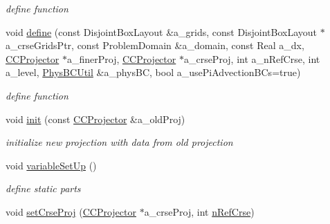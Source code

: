 \begin{DoxyCompactItemize}
\begin{DoxyCompactList}\small\item\em define function \end{DoxyCompactList}\item 
\hypertarget{class_c_c_projector_a4206ad38acdba73ac2cb102bf7c304ad}{void \hyperlink{class_c_c_projector_a4206ad38acdba73ac2cb102bf7c304ad}{define} (const Disjoint\-Box\-Layout \&a\-\_\-grids, const Disjoint\-Box\-Layout $\ast$a\-\_\-crse\-Grids\-Ptr, const Problem\-Domain \&a\-\_\-domain, const Real a\-\_\-dx, \hyperlink{class_c_c_projector}{C\-C\-Projector} $\ast$a\-\_\-finer\-Proj, \hyperlink{class_c_c_projector}{C\-C\-Projector} $\ast$a\-\_\-crse\-Proj, int a\-\_\-n\-Ref\-Crse, int a\-\_\-level, \hyperlink{class_phys_b_c_util}{Phys\-B\-C\-Util} \&a\-\_\-phys\-B\-C, bool a\-\_\-use\-Pi\-Advection\-B\-Cs=true)}\label{class_c_c_projector_a4206ad38acdba73ac2cb102bf7c304ad}

\begin{DoxyCompactList}\small\item\em define function \end{DoxyCompactList}\item 
\hypertarget{class_c_c_projector_a21effc1cbe234d3a1f5fb9215a6e8828}{void \hyperlink{class_c_c_projector_a21effc1cbe234d3a1f5fb9215a6e8828}{init} (const \hyperlink{class_c_c_projector}{C\-C\-Projector} \&a\-\_\-old\-Proj)}\label{class_c_c_projector_a21effc1cbe234d3a1f5fb9215a6e8828}

\begin{DoxyCompactList}\small\item\em initialize new projection with data from old projection \end{DoxyCompactList}\item 
\hypertarget{class_c_c_projector_abab3938be8033546c9d60b123595d826}{void \hyperlink{class_c_c_projector_abab3938be8033546c9d60b123595d826}{variable\-Set\-Up} ()}\label{class_c_c_projector_abab3938be8033546c9d60b123595d826}

\begin{DoxyCompactList}\small\item\em define static parts \end{DoxyCompactList}\item 
\hypertarget{class_c_c_projector_a90f1a765c266cc5aff5a675bc33d442e}{void \hyperlink{class_c_c_projector_a90f1a765c266cc5aff5a675bc33d442e}{set\-Crse\-Proj} (\hyperlink{class_c_c_projector}{C\-C\-Projector} $\ast$a\-\_\-crse\-Proj, int \hyperlink{class_c_c_projector_a4d0ad1e561b567a441489b9b9c79b643}{n\-Ref\-Crse})}\label{class_c_c_projector_a90f1a765c266cc5aff5a675bc33d442e}


\end{DoxyCompactItemize}
